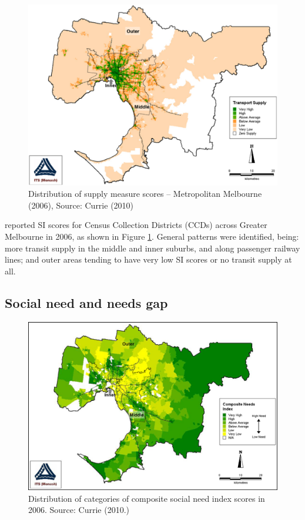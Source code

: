 \documentclass[preprint, 3p,
authoryear]{elsarticle} %
\begin{document}
\begin{figure}
\includegraphics[width=1\linewidth]{graphics/Currie2010SI} \caption{Distribution of supply measure scores – Metropolitan Melbourne (2006), Source: Currie (2010)}\label{fig:Currie_map_SI}
\end{figure}

\citet{currie2010identifying} reported SI scores for Census Collection
Districts (CCDs) across Greater Melbourne in 2006, as shown in Figure
\ref{fig:Currie_map_SI}. General patterns were identified, being: more
transit supply in the middle and inner suburbs, and along passenger
railway lines; and outer areas tending to have very low SI scores or no
transit supply at all.

\subsection{Social need and needs gap}\label{social-need-and-needs-gap}

\begin{figure}
\includegraphics[width=1\linewidth]{graphics/Currie2010Needs} \caption{Distribution of categories of composite social need index scores in 2006. Source: Currie (2010.)}\label{fig:Currie_map_needs}
\end{figure}
\end{document}
